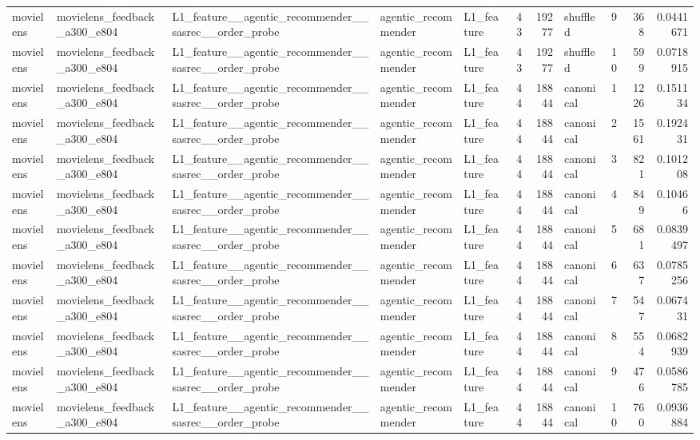 \begin{table}[htbp!]
\begin{tabular}{lllllrrlrrr}
movielens & movielens\_feedback\_a300\_e804 & L1\_feature\_\_agentic\_recommender\_\_sasrec\_\_order\_probe & agentic\_recommender & L1\_feature & 43 & 19277 & shuffled & 9 & 368 & 0.0441671 \\
movielens & movielens\_feedback\_a300\_e804 & L1\_feature\_\_agentic\_recommender\_\_sasrec\_\_order\_probe & agentic\_recommender & L1\_feature & 43 & 19277 & shuffled & 10 & 599 & 0.0718915 \\
movielens & movielens\_feedback\_a300\_e804 & L1\_feature\_\_agentic\_recommender\_\_sasrec\_\_order\_probe & agentic\_recommender & L1\_feature & 44 & 18844 & canonical & 1 & 1226 & 0.151134 \\
movielens & movielens\_feedback\_a300\_e804 & L1\_feature\_\_agentic\_recommender\_\_sasrec\_\_order\_probe & agentic\_recommender & L1\_feature & 44 & 18844 & canonical & 2 & 1561 & 0.192431 \\
movielens & movielens\_feedback\_a300\_e804 & L1\_feature\_\_agentic\_recommender\_\_sasrec\_\_order\_probe & agentic\_recommender & L1\_feature & 44 & 18844 & canonical & 3 & 821 & 0.101208 \\
movielens & movielens\_feedback\_a300\_e804 & L1\_feature\_\_agentic\_recommender\_\_sasrec\_\_order\_probe & agentic\_recommender & L1\_feature & 44 & 18844 & canonical & 4 & 849 & 0.10466 \\
movielens & movielens\_feedback\_a300\_e804 & L1\_feature\_\_agentic\_recommender\_\_sasrec\_\_order\_probe & agentic\_recommender & L1\_feature & 44 & 18844 & canonical & 5 & 681 & 0.0839497 \\
movielens & movielens\_feedback\_a300\_e804 & L1\_feature\_\_agentic\_recommender\_\_sasrec\_\_order\_probe & agentic\_recommender & L1\_feature & 44 & 18844 & canonical & 6 & 637 & 0.0785256 \\
movielens & movielens\_feedback\_a300\_e804 & L1\_feature\_\_agentic\_recommender\_\_sasrec\_\_order\_probe & agentic\_recommender & L1\_feature & 44 & 18844 & canonical & 7 & 547 & 0.067431 \\
movielens & movielens\_feedback\_a300\_e804 & L1\_feature\_\_agentic\_recommender\_\_sasrec\_\_order\_probe & agentic\_recommender & L1\_feature & 44 & 18844 & canonical & 8 & 554 & 0.0682939 \\
movielens & movielens\_feedback\_a300\_e804 & L1\_feature\_\_agentic\_recommender\_\_sasrec\_\_order\_probe & agentic\_recommender & L1\_feature & 44 & 18844 & canonical & 9 & 476 & 0.0586785 \\
movielens & movielens\_feedback\_a300\_e804 & L1\_feature\_\_agentic\_recommender\_\_sasrec\_\_order\_probe & agentic\_recommender & L1\_feature & 44 & 18844 & canonical & 10 & 760 & 0.0936884 \\

\end{tabular}
\end{table}
